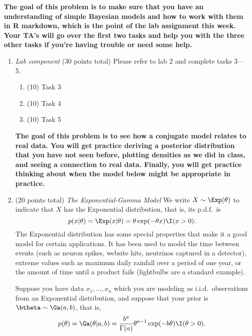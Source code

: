 \documentclass{article}
\begin{document}
\textbf{The goal of this problem is to make sure that you have an understanding of simple Bayesian models and how to work with them in R markdown, which is the point of the lab assignment this week. Your TA's will go over the first two tasks and help you with the three other tasks if you're having trouble or need some help.}
\begin{enumerate}
\item {\em Lab component} 
  (30 points total) Please refer to lab 2 and complete tasks 3---5. 
  \begin{enumerate}
  \item (10) Task 3
  \item (10) Task 4
  \item (10) Task 5
  \end{enumerate}
  
\newpage
\textbf{The goal of this problem is to see how a conjugate model relates to real data. You will get practice deriving a posterior distribution that you have not seen before, plotting densities as we did in class, and seeing a connection to real data. Finally, you will get practice thinking about when the model below might be appropriate in practice.}  
\item (20  points total) {\em The Exponential-Gamma Model}
We write $X\sim\Exp(\theta)$ to indicate that $X$ has the Exponential distribution, that is, its p.d.f.\ is
$$ p(x|\theta) =\Exp(x|\theta) = \theta\exp(-\theta x)\I(x>0). $$
The Exponential distribution has some special properties that make it a good model for certain applications. It has been used to model the time between events (such as neuron spikes, website hits, neutrinos captured in a detector), extreme values such as maximum daily rainfall over a period of one year, or the amount of time until a product fails (lightbulbs are a standard example).

Suppose you have data $x_1,\dotsc,x_n$ which you are modeling as i.i.d.\ observations from an Exponential distribution, and suppose that your prior is $\btheta\sim\Ga(a,b)$, that is,
$$ p(\theta) = \Ga(\theta|a,b) = \frac{b^a}{\Gamma(a)}\theta^{a-1}\exp(-b\theta) \I(\theta>0). $$


\end{enumerate}
\end{document}

